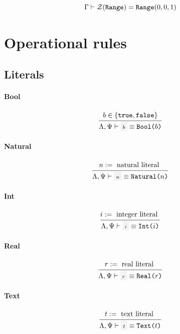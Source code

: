 \[
	\Gamma\vdash \mathcal{Z}(\texttt{Range}) = \texttt{Range}(0, 0, 1)
\]

\clearpage

\section{Operational rules}

\subsection{Literals}


\paragraph{Bool}

\[
	\oprule{
		b \in \set{\texttt{true}, \texttt{false}}
	}{
		\EnvLoc,\EnvStore\then \code{$b$} \eval \texttt{Bool($b$)}
	}
\]

\paragraph{Natural}

\[
	\oprule{
		n := \text{ natural literal }
	}{
		\EnvLoc,\EnvStore\then \code{$n$} \eval \texttt{Natural($n$)}
	}
\]

\paragraph{Int}

\[
	\oprule{
		i := \text{ integer literal }
	}{
		\EnvLoc,\EnvStore\then \code{$i$} \eval \texttt{Int($i$)}
	}
\]

\paragraph{Real}

\[
	\oprule{
		r := \text{ real literal }
	}{
		\EnvLoc,\EnvStore\then \code{$r$} \eval \texttt{Real($r$)}
	}
\]


\paragraph{Text}

\[
	\oprule{
		t := \text{ text literal }
	}{
		\EnvLoc,\EnvStore\then \code{$t$} \eval \texttt{Text($t$)}
	}
\]


